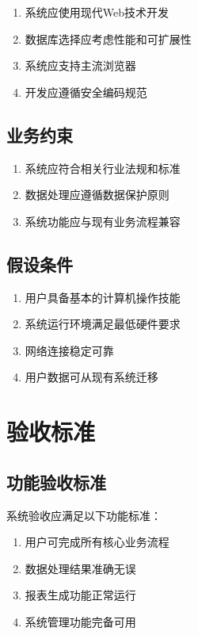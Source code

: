 \documentclass[a4paper,12pt]{article}
\begin{document}
\begin{enumerate}
  \item 系统应使用现代Web技术开发
  \item 数据库选择应考虑性能和可扩展性
  \item 系统应支持主流浏览器
  \item 开发应遵循安全编码规范
\end{enumerate}

\subsection{业务约束}

\begin{enumerate}
  \item 系统应符合相关行业法规和标准
  \item 数据处理应遵循数据保护原则
  \item 系统功能应与现有业务流程兼容
\end{enumerate}

\subsection{假设条件}

\begin{enumerate}
  \item 用户具备基本的计算机操作技能
  \item 系统运行环境满足最低硬件要求
  \item 网络连接稳定可靠
  \item 用户数据可从现有系统迁移
\end{enumerate}

\section{验收标准}

\subsection{功能验收标准}

系统验收应满足以下功能标准：

\begin{enumerate}
  \item 用户可完成所有核心业务流程
  \item 数据处理结果准确无误
  \item 报表生成功能正常运行
  \item 系统管理功能完备可用
\end{enumerate}
\end{document}
